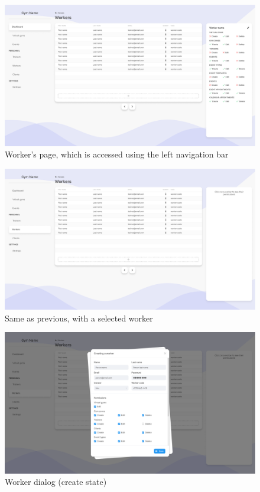 \documentclass[a4paper, 12pt, oneside]{book}
\begin{document}
\begin{figure}[H]
	\centering
	\includegraphics[width=\textwidth]{assets/ui/WorkersSelected.png}
	\caption{Worker's page, which is accessed using the left navigation bar}
\end{figure}
\begin{figure}[H]
	\centering
	\includegraphics[width=\textwidth]{assets/ui/WorkersUnselected.png}
	\caption{Same as previous, with a selected worker}
\end{figure}
\begin{figure}[H]
	\centering
	\includegraphics[width=\textwidth]{assets/ui/WorkersCreate.png}
	\caption{Worker dialog (create state)}
\end{figure}
\end{document}

